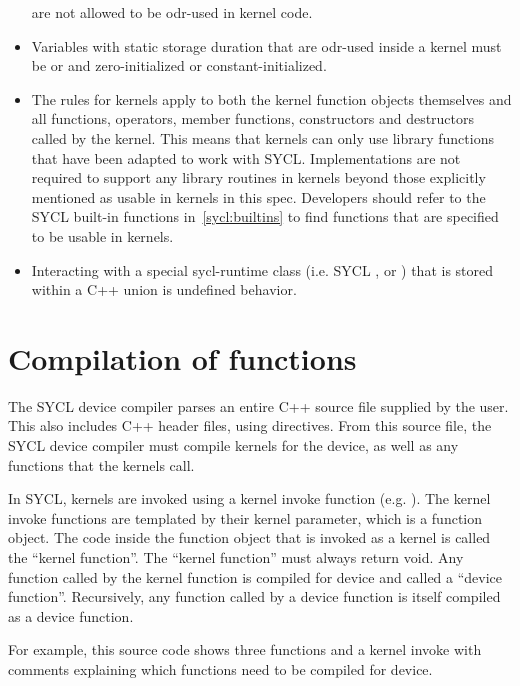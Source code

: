 \begin{itemize}
    are not allowed to be odr-used in kernel code.
  \item
    Variables with static storage duration that are odr-used inside a kernel
    must be  or  and zero-initialized or
    constant-initialized.
  \item
    The rules for kernels apply to both the kernel function objects themselves
    and all functions, operators, member functions, constructors and destructors
    called by the kernel. This means that kernels can only use library functions
    that have been adapted to work with SYCL. Implementations are not required
    to support any library routines in kernels beyond those explicitly mentioned
    as usable in kernels in this spec. Developers should refer to the SYCL
    built-in functions in~\ref{sycl:builtins} to find functions that are
    specified to be usable in kernels.
  \item
     Interacting with a special \gls{sycl-runtime} class (i.e. SYCL ,  or ) that is stored within a C++ union is undefined behavior.
\end{itemize}

\section{Compilation of functions}

The SYCL device compiler parses an entire C++ source file supplied by the user.
This also includes C++ header files, using  directives. From this
source file, the SYCL device compiler must compile kernels for the device, as
well as any functions that the kernels call.

In SYCL, kernels are invoked using a kernel invoke function (e.g.
). The kernel invoke functions are templated by their
kernel parameter, which is a function object.
The code inside the function object that is invoked as a kernel is called
the ``kernel function''. The ``kernel function'' must always return void. Any
function called by the kernel function is compiled for device and called a
``device function''. Recursively, any function called by a device function is
itself compiled as a device function.

For example, this source code shows three functions and a kernel invoke with
comments explaining which functions need to be compiled for device.

